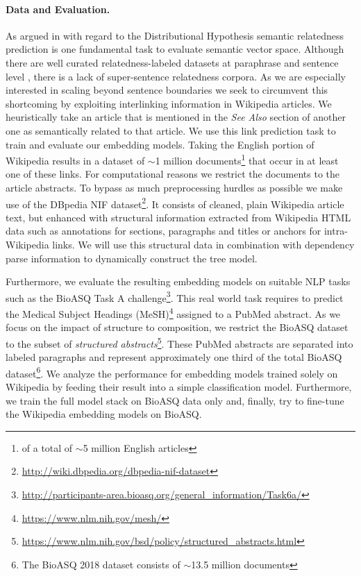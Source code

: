 
\paragraph{Data and Evaluation.}As argued in \textcite{binder_comparison_2018} with regard to the Distributional Hypothesis \autocite{harris_distributional_1954} semantic relatedness \autocite{resnik_semantic_1999, budanitsky_evaluating_2006} prediction is one fundamental task to evaluate semantic vector space. Although there are well curated relatedness-labeled datasets at paraphrase and sentence level \autocite{pavlick_ppdb_2015, dolan_automatically_2005, marelli_sick_2014,cer_semeval-2017_2017}, there is a lack of super-sentence relatedness corpora. As we are especially interested in scaling beyond sentence boundaries %
we seek to circumvent this shortcoming by exploiting interlinking information in Wikipedia articles. We heuristically take an article that is mentioned in the \textit{See Also} %
section of another one as semantically related to that article. We use this link prediction task to train and evaluate our embedding models. Taking the English portion of Wikipedia results in a dataset of $\sim$1 million documents\footnote{of a total of $\sim$5 million English articles} that occur in at least one of these links. For computational reasons we restrict the documents to the article abstracts. To bypass as much preprocessing hurdles as possible we make use of the DBpedia NIF \autocite{dojchinovski_dbpedia_2018} dataset\footnote{\url{http://wiki.dbpedia.org/dbpedia-nif-dataset}}. It consists of cleaned, plain Wikipedia article text, but enhanced with structural information extracted from Wikipedia HTML data such as annotations for sections, paragraphs and titles or anchors for intra-Wikipedia links. We will use this structural data in combination with dependency parse information to dynamically construct the tree model.

Furthermore, we evaluate the resulting embedding models on suitable \ac{NLP} tasks such as the BioASQ Task A challenge\footnote{\url{http://participants-area.bioasq.org/general_information/Task6a/}}. This real world task requires to predict the Medical Subject Headings (MeSH)\footnote{\url{https://www.nlm.nih.gov/mesh/}} assigned to a PubMed abstract. As we focus on the impact of structure to composition, we restrict the BioASQ dataset to the subset of \textit{structured abstracts}\footnote{\url{https://www.nlm.nih.gov/bsd/policy/structured_abstracts.html}}. These PubMed abstracts are separated into labeled paragraphs and represent approximately one third of the total BioASQ dataset\footnote{The BioASQ 2018 dataset consists of $\sim$13.5 million documents}. We analyze the performance for embedding models trained solely on Wikipedia by feeding their result into a simple classification model. Furthermore, we train the full model stack on BioASQ data only and, finally, try to fine-tune the Wikipedia embedding models on BioASQ.  

